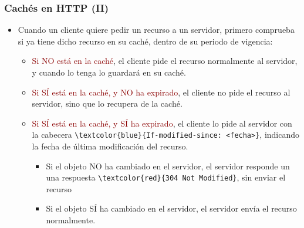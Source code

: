 \documentclass[hyperref={pdfpagelabels=true},ucs]{beamer}
\newcommand{\res}[1]{\textcolor{darkred}{#1}}
\begin{document}
\begin{frame}[fragile]
\frametitle{Cachés en HTTP (II)}


\begin{itemize}
\item Cuando un cliente quiere pedir un recurso a un servidor, primero
  comprueba si ya tiene dicho recurso en su caché, dentro de su
  periodo de vigencia:
  \begin{itemize}
  \item \res{Si NO está en la caché}, el cliente pide el recurso normalmente
    al servidor, y cuando lo tenga lo guardará en su caché.
  \item \res{Si SÍ está en la caché, y NO ha expirado}, el cliente no pide
    el recurso al servidor, sino que lo recupera de la caché.
  \item \res{Si SÍ está en la caché, y SÍ ha expirado}, el cliente lo
    pide al servidor con la cabecera 
    \Verb|\textcolor{blue}{If-modified-since: <fecha>}|, indicando la fecha de última
    modificación del recurso.
    \begin{itemize}
    \item Si el objeto NO ha cambiado en el servidor, el servidor
      responde un una respuesta \Verb|\textcolor{red}{304 Not Modified}|, sin enviar el recurso
    \item Si el objeto SÍ ha cambiado en el servidor, el servidor
      envía el recurso normalmente.
    \end{itemize}
  \end{itemize}

\end{itemize}


\end{frame}



\end{document}
